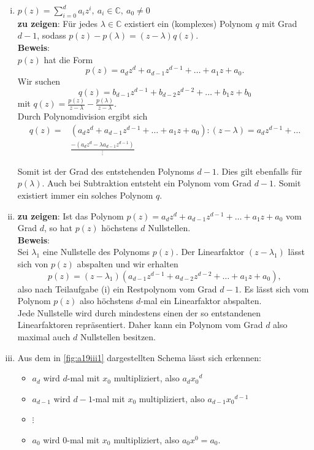\documentclass[12pt,a4paper]{article}
\begin{document}
\begin{enumerate}[(i)]
    \item $p(z) = \sum\limits_{i=0}^d a_iz^i,\ a_i \in \mathbb{C},\ a_0 \neq 0$\\

    \textbf{zu zeigen}: Für jedes $\lambda \in \mathbb{C}$ existiert ein (komplexes) Polynom $q$ mit Grad $d-1$, sodass $p(z) - p(\lambda) = (z - \lambda) q(z)$.\\

    \textbf{Beweis}:\\
    $p(z)$ hat die Form
    $$p(z) = a_d z^d + a_{d-1} z^{d-1} + \ldots + a_1 z + a_0.$$
    Wir suchen
    $$q(z) = b_{d-1} z^{d-1} + b_{d-2} z^{d-2} + \ldots + b_1 z + b_0$$
    mit $q(z) = \frac{p(z)}{z - \lambda} - \frac{p(\lambda)}{z - \lambda}$.\\

    Durch Polynomdivision ergibt sich
    \begin{align*}
        q(z) = &(a_d z^d + a_{d-1} z^{d-1} + \ldots + a_1 z + a_0) : (z - \lambda) = a_d z^{d-1} + \ldots\\
        &\frac{-(a_d z^d - \lambda a_{d-1} z^{d-1})}{\vdots}
    \end{align*}

    Somit ist der Grad des entstehenden Polynoms $d-1$.
    Dies gilt ebenfalls für $p(\lambda)$.
    Auch bei Subtraktion entsteht ein Polynom vom Grad $d-1$.
    Somit existiert immer ein solches Polynom $q$.

    \item \textbf{zu zeigen}: Ist das Polynom $p(z) = a_d z^d + a_{d-1} z^{d-1} + \ldots + a_1 z + a_0$ vom Grad $d$, so hat $p(z)$ höchstens $d$ Nullstellen.\\

    \textbf{Beweis}:\\
    Sei $\lambda_1$ eine Nullstelle des Polynoms $p(z)$.
    Der Linearfaktor $(z - \lambda_1)$ lässt sich von $p(z)$ abspalten und wir erhalten
    $$p(z) = (z - \lambda_1) (a_{d-1} z^{d-1} + a_{d-2} z^{d-2} + \ldots + a_1 z + a_0),$$
    also nach Teilaufgabe (i) ein Restpolynom vom Grad $d-1$.
    Es lässt sich vom Polynom $p(z)$ also höchstens $d$-mal ein Linearfaktor abspalten.\\
    Jede Nullstelle wird durch mindestens einen der so entstandenen Linearfaktoren repräsentiert.
    Daher kann ein Polynom vom Grad $d$ also maximal auch $d$ Nullstellen besitzen.

    \item Aus dem in \autoref{fig:a19iii1} dargestellten Schema lässt sich erkennen:
    \begin{itemize}
        \item $a_d$ wird $d$-mal mit $x_0$ multipliziert, also $a_d {x_0}^d$
        \item $a_{d-1}$ wird $d-1$-mal mit $x_0$ multipliziert, also $a_{d-1} {x_0}^{d-1}$
        \item $\vdots$
        \item $a_0$ wird 0-mal mit $x_0$ multipliziert, also $a_0 x^0 = a_0$.
    \end{itemize}


\end{enumerate}
\end{document}
